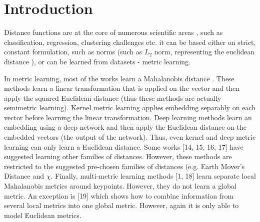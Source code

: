 
\chapter{Introduction} %

\label{Chapter1} %


\newcommand{\keyword}[1]{\textbf{#1}}
\newcommand{\tabhead}[1]{\textbf{#1}}
\newcommand{\code}[1]{\texttt{#1}}
\newcommand{\file}[1]{\texttt{\bfseries#1}}
\newcommand{\option}[1]{\texttt{\itshape#1}}


Distance functions are at the core of numerous scientific areas , such as classification, regression, clustering challenges etc.
it can be based either on strict, constant formulation, such as norms \cite{trefethen1997numerical} (such as $L_2$ norm, representing the euclidean distance \cite{danielsson1980euclidean}), or can be learned from datasets - metric learning.

In metric learning, most of the works learn a Mahalanobis distance \cite{de2000mahalanobis}. These methods learn a linear transformation that is applied on the vector and then apply the squared Euclidean distance (thus these methods are actually semimetric learning). 
Kernel metric learning applies embedding separably on each vector before learning the linear transformation. 
Deep learning \cite{lecun2015deep} methods learn an embedding using a deep network and then apply the Euclidean distance on the embedded vectors (the output of the network). Thus, even kernel and deep metric learning can only learn a Euclidean distance. 
Some works [14, 15, 16, 17] have suggested learning other families of distances. However, these methods are restricted to the suggested pre-chosen families of distances (e.g. Earth Mover’s Distance and $\chi$.
Finally, multi-metric learning methods [1, 18] learn separate local Mahalanobis metrics around
keypoints. However, they do not learn a global metric. An exception is [19] which shows how
to combine information from several local metrics into one global metric. However, again it is only able to model Euclidean metrics.

